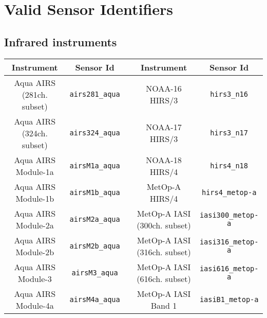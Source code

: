 \chapter{Valid Sensor Identifiers}
\label{sec:sensor_id}

\clearpage
\section{Infrared instruments}
\label{sec:infrared_instruments_sensor_id}

\begin{table}[htp]
  \centering
  \begin{tabular}{c c c c c}
    \hline
    \sffamily\textbf{Instrument} & \sffamily\textbf{Sensor Id} & \hspace{0.2cm} & \sffamily\textbf{Instrument} & \sffamily\textbf{Sensor Id} \\
    \hline\hline
Aqua AIRS (281ch. subset) & \texttt{airs281\_aqua} & \hspace{0.2cm} & NOAA-16 HIRS/3 & \texttt{hirs3\_n16}                      \\
Aqua AIRS (324ch. subset) & \texttt{airs324\_aqua} & \hspace{0.2cm} & NOAA-17 HIRS/3 & \texttt{hirs3\_n17}                      \\
Aqua AIRS Module-1a & \texttt{airsM1a\_aqua}       & \hspace{0.2cm} & NOAA-18 HIRS/4 & \texttt{hirs4\_n18}                      \\
Aqua AIRS Module-1b & \texttt{airsM1b\_aqua}       & \hspace{0.2cm} & MetOp-A HIRS/4 & \texttt{hirs4\_metop-a}                  \\
Aqua AIRS Module-2a & \texttt{airsM2a\_aqua}       & \hspace{0.2cm} & MetOp-A IASI (300ch. subset) & \texttt{iasi300\_metop-a}  \\
Aqua AIRS Module-2b & \texttt{airsM2b\_aqua}       & \hspace{0.2cm} & MetOp-A IASI (316ch. subset)  & \texttt{iasi316\_metop-a} \\
Aqua AIRS Module-3  & \texttt{airsM3\_aqua}        & \hspace{0.2cm} & MetOp-A IASI (616ch. subset)  & \texttt{iasi616\_metop-a} \\
Aqua AIRS Module-4a & \texttt{airsM4a\_aqua}       & \hspace{0.2cm} & MetOp-A IASI Band 1 & \texttt{iasiB1\_metop-a}            \\

\end{tabular}
\end{table}
